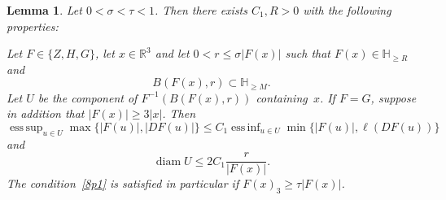 \documentclass[12pt,a4paper]{amsart}
\theoremstyle{plain}
\newtheorem{lemma}[theorem]{Lemma}
\theoremstyle{definition}
\theoremstyle{remark}
\newcommand{\diam}{\operatorname{diam}}
\DeclareMathOperator*{\esssup}{ess\,sup}
\DeclareMathOperator*{\essinf}{ess\,inf}
\def\R{\mathbb R}
\def\H{\mathbb H}
\numberwithin{equation}{section}
\begin{document}
\begin{lemma} \label{lemma1}
Let $0<\sigma<\tau<1$.
Then there exists $C_1,R>0$ with the following properties:

Let $F\in\{Z,H,G\}$, let $x\in\R^3$ and
let $0<r\leq \sigma |F(x)|$ such that $F(x)\in \H_{\geq R}$ and
\begin{equation}\label{8p1}
B(F(x),r)\subset\H_{\geq M}.
\end{equation}
Let $U$ be the component of $F^{-1}(B(F(x),r))$ containing~$x$.
If $F=G$, suppose in addition that $|F(x)|\geq 3|x|$. Then 
\begin{equation}\label{8q}
\esssup_{u\in U} \max \{|F(u)|,|DF(u)|\}
\leq C_1 \essinf_{u\in U} \min \{|F(u)|,\ell(DF(u))\}
\end{equation}
and
\begin{equation}\label{8r}
\diam U\leq 2C_1 \frac{r}{|F(x)|}.
\end{equation}
The condition~\eqref{8p1} is satisfied in particular if $F(x)_3\geq \tau|F(x)|$.
\end{lemma}
\end{document}
